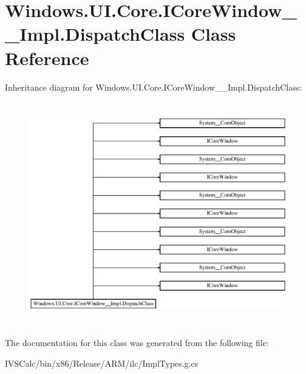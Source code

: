 \hypertarget{class_windows_1_1_u_i_1_1_core_1_1_i_core_window_____impl_1_1_dispatch_class}{}\section{Windows.\+U\+I.\+Core.\+I\+Core\+Window\+\_\+\+\_\+\+Impl.\+Dispatch\+Class Class Reference}
\label{class_windows_1_1_u_i_1_1_core_1_1_i_core_window_____impl_1_1_dispatch_class}
Inheritance diagram for Windows.\+U\+I.\+Core.\+I\+Core\+Window\+\_\+\+\_\+\+Impl.\+Dispatch\+Class\+:\begin{figure}[H]
\begin{center}
\leavevmode
\includegraphics[height=9.746835cm]{class_windows_1_1_u_i_1_1_core_1_1_i_core_window_____impl_1_1_dispatch_class}
\end{center}
\end{figure}


The documentation for this class was generated from the following file\+:\begin{DoxyCompactItemize}
\item 
I\+V\+S\+Calc/bin/x86/\+Release/\+A\+R\+M/ilc/Impl\+Types.\+g.\+cs\end{DoxyCompactItemize}
